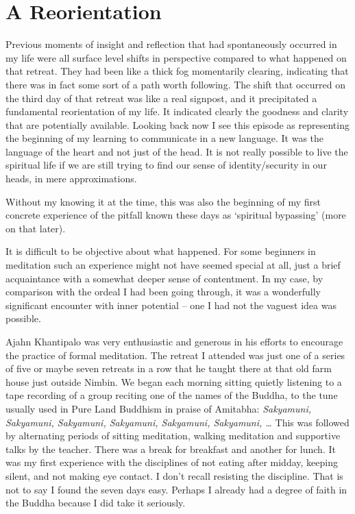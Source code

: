 \chapter{A Reorientation}

Previous moments of insight and reflection that had spontaneously
occurred in my life were all surface level shifts in perspective
compared to what happened on that retreat. They had been like a thick
fog momentarily clearing, indicating that there was in fact some sort of
a path worth following. The shift that occurred on the third day of that
retreat was like a real signpost, and it precipitated a fundamental
reorientation of my life. It indicated clearly the goodness and clarity
that are potentially available. Looking back now I see this episode as
representing the beginning of my learning to communicate in a new
language. It was the language of the heart and not just of the head. It
is not really possible to live the spiritual life if we are still trying
to find our sense of identity/security in our heads, in mere
approximations.

Without my knowing it at the time, this was also the beginning of my
first concrete experience of the pitfall known these days as `spiritual
bypassing' (more on that later).

It is difficult to be objective about what happened. For some beginners
in meditation such an experience might not have seemed special at all,
just a brief acquaintance with a somewhat deeper sense of contentment.
In my case, by comparison with the ordeal I had been going through, it
was a wonderfully significant encounter with inner potential -- one I
had not the vaguest idea was possible.

Ajahn Khantipalo was very enthusiastic and generous in his efforts to
encourage the practice of formal meditation. The retreat I attended was
just one of a series of five or maybe seven retreats in a row that he
taught there at that old farm house just outside Nimbin. We began each
morning sitting quietly listening to a tape recording of a group
reciting one of the names of the Buddha, to the tune usually used in
Pure Land Buddhism in praise of Amitabha: \emph{Sakyamuni, Sakyamuni,
Sakyamuni, Sakyamuni, Sakyamuni, Sakyamuni, \ldots{}} This was followed
by alternating periods of sitting meditation, walking meditation and
supportive talks by the teacher. There was a break for breakfast and
another for lunch. It was my first experience with the disciplines of
not eating after midday, keeping silent, and not making eye contact. I
don't recall resisting the discipline. That is not to say I found the
seven days easy. Perhaps I already had a degree of faith in the Buddha
because I did take it seriously.

